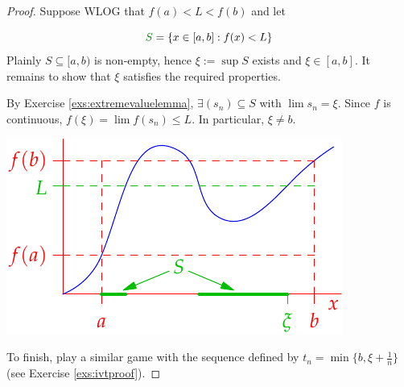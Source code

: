 \begin{proof}
	Suppose WLOG that $f(a)<L<f(b)$ and let\par
	\begin{minipage}[t]{0.55\linewidth}\vspace{-15pt}
		\[
			\textcolor{Green}{S}=\{x\in[a,b]:f(x)<L\}
		\]
		Plainly $S\subseteq [a,b)$ is non-empty, hence $\xi:=\sup S$ exists and $\xi\in[a,b]$. It remains to show that $\xi$ satisfies the required properties.\medbreak
		
		By Exercise \ref{exs:extremevaluelemma}, $\exists(s_n)\subseteq S$ with $\lim s_n=\xi$.
		Since $f$ is continuous, $f(\xi)=\lim f(s_n)\le L$. In particular, $\xi\neq b$.
	\end{minipage}
	\hfill
	\begin{minipage}[t]{0.44\linewidth}\vspace{-15pt}
		\flushright\includegraphics{intval}
	\end{minipage}
	\medbreak
	
	To finish, play a similar game with the sequence defined by $t_n=\min\{b,\xi+\frac 1n\}$ (see Exercise \ref{exs:ivtproof}).
\end{proof}


